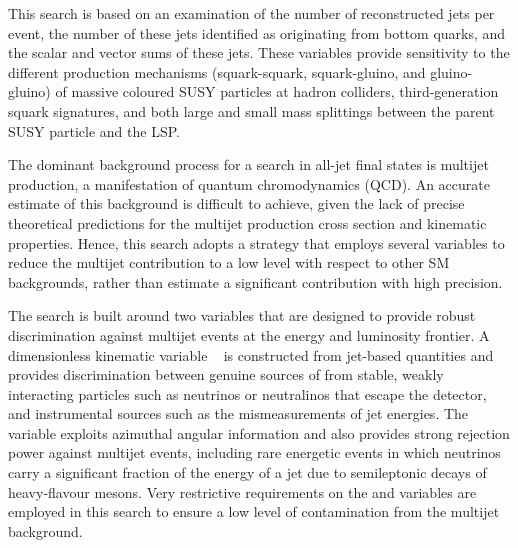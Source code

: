 This search is based on an examination of the number of reconstructed
jets per event, the number of these jets identified as originating
from bottom quarks, and the scalar and vector \Pt sums of these
jets. These variables provide sensitivity to the different production
mechanisms (squark-squark, squark-gluino, and gluino-gluino) of
massive coloured SUSY particles at hadron colliders, third-generation
squark signatures, and both large and small mass splittings between
the parent SUSY particle and the LSP.

The dominant background process for a search in all-jet final states
is multijet production, a manifestation of quantum chromodynamics
(QCD). An accurate estimate of this background is difficult to
achieve, given the lack of precise theoretical predictions for the
multijet production cross section and kinematic properties. 
Hence, this search adopts a strategy that employs several variables to
reduce the multijet contribution to a low level with respect to other
SM backgrounds, rather than estimate a significant contribution with
high precision.


The search is built around two variables that are designed to provide
robust discrimination against multijet events at the energy and
luminosity frontier. A dimensionless kinematic variable
\alphat~\cite{Randall:2008rw, RA1Paper} is constructed from jet-based
quantities and provides discrimination between genuine sources of
\ptvecmiss from stable, weakly interacting particles such as neutrinos
or neutralinos that escape the detector, and instrumental sources such
as the mismeasurements of jet energies. The \bdphi~\cite{RA1Paper}
variable exploits azimuthal angular information and also provides
strong rejection power against multijet events, including rare
energetic events in which neutrinos carry a significant fraction of
the energy of a jet due to semileptonic decays of heavy-flavour
mesons. Very restrictive requirements on the \alphat and \dphi
variables are employed in this search to ensure a low level of
contamination from the multijet background.

